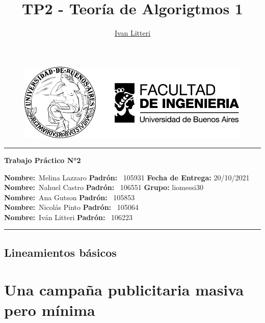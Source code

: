 \documentclass[hidelinks]{report}
\title{TP2 - Teoría de Algorigtmos 1}
\author{\href{https://github.com/ilitteri}{Ivan Litteri}}
\date{}
\begin{document}
	
\begin{figure}
	\centering
	\includegraphics{assets/banner_fiuba.pdf}
\end{figure}

\begin{center}
	\hrule
	\vspace{.4cm}
	{\textbf { \large Trabajo Práctico N°2}}
\end{center}
{\textbf{Nombre:}\ Melina Lazzaro \> \textbf{Padrón:}} \ 105931 \hspace{\fill} \textbf{Fecha de Entrega:} 20/10/2021   \\
{\textbf{Nombre:}\ Nahuel Castro \>\>\> \textbf{Padrón:}} \ 106551 \hspace{\fill} \textbf{Grupo:} liomessi30   \\
{\textbf{Nombre:}\ Ana Gutson \>\>\>\>\>\>\> \textbf{Padrón:}} \ 105853 \hspace{\fill}    \\
{\textbf{Nombre:}\ Nicolás Pinto \>\>\>\>\> \textbf{Padrón:}} \ 105064 \hspace{\fill}    \\
{\textbf{Nombre:}\ Iván Litteri \>\>\>\>\>\>\>\> \textbf{Padrón:}} \ 106223 \hspace{\fill}    \\
	\hrule

\section*{Lineamientos básicos}


\tableofcontents
\clearpage

\chapter{Una campaña publicitaria masiva pero mínima}

\clearpage
\end{document}
